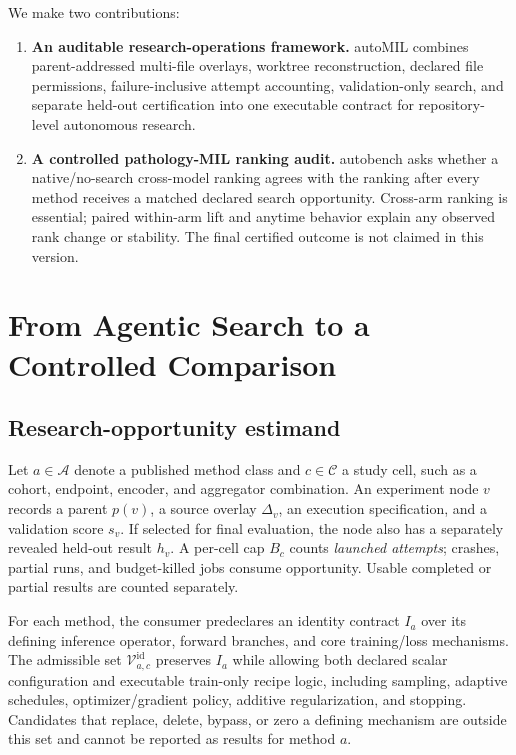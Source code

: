\documentclass{article}
\newcommand{\ours}{\textsf{autoMIL}\xspace}
\newcommand{\autobench}{\textsf{autobench}\xspace}
\begin{document}
We make two contributions:
\begin{enumerate}[leftmargin=*,itemsep=2pt,topsep=2pt]
  \item \textbf{An auditable research-operations framework.}  \ours combines
  parent-addressed multi-file overlays, worktree reconstruction, declared file
  permissions, failure-inclusive attempt accounting, validation-only search,
  and separate held-out certification into one executable contract for
  repository-level autonomous research.
  \item \textbf{A controlled pathology-MIL ranking audit.}  \autobench asks
  whether a native/no-search cross-model ranking agrees with the ranking after
  every method receives a matched declared search opportunity.  Cross-arm
  ranking is essential; paired within-arm lift and anytime behavior explain
  any observed rank change or stability.  The final certified outcome is not
  claimed in this version.
\end{enumerate}

\section{From Agentic Search to a Controlled Comparison}
\label{sec:estimand}

\subsection{Research-opportunity estimand}

Let $a\in\mathcal{A}$ denote a published method class and
$c\in\mathcal{C}$ a study cell, such as a cohort, endpoint, encoder, and
aggregator combination.  An experiment node $v$ records a parent $p(v)$, a
source overlay $\Delta_v$, an execution specification, and a validation score
$s_v$.  If selected for final evaluation, the node also has a separately
revealed held-out result $h_v$.  A per-cell cap $B_c$ counts \emph{launched
attempts}; crashes, partial runs, and budget-killed jobs consume opportunity.
Usable completed or partial results are counted separately.

For each method, the consumer predeclares an identity contract $I_a$ over its
defining inference operator, forward branches, and core training/loss
mechanisms.  The admissible set $\mathcal{V}^{\mathrm{id}}_{a,c}$ preserves
$I_a$ while allowing both declared scalar configuration and executable
train-only recipe logic, including sampling, adaptive schedules,
optimizer/gradient policy, additive regularization, and stopping.  Candidates
that replace, delete, bypass, or zero a defining mechanism are outside this set
and cannot be reported as results for method $a$.
\end{document}
